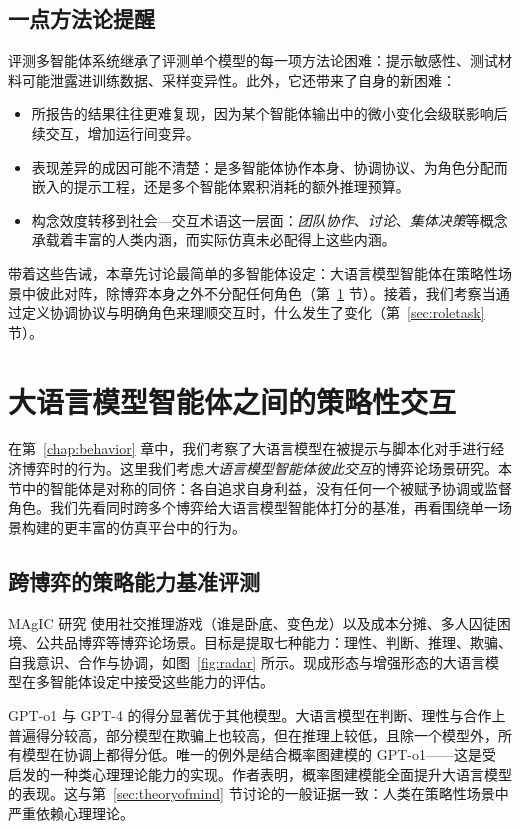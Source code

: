 \subsection{一点方法论提醒}
评测多智能体系统继承了评测单个模型的每一项方法论困难：提示敏感性、测试材料可能泄露进训练数据、采样变异性。此外，它还带来了自身的新困难：
\begin{itemize}
    \item 所报告的结果往往更难复现，因为某个智能体输出中的微小变化会级联影响后续交互，增加运行间变异。
    \item 表现差异的成因可能不清楚：是多智能体协作本身、协调协议、为角色分配而嵌入的提示工程，还是多个智能体累积消耗的额外推理预算。
    \item 构念效度转移到社会—交互术语这一层面：{\em 团队协作}、{\em 讨论}、{\em 集体决策}等概念承载着丰富的人类内涵，而实际仿真未必配得上这些内涵。
\end{itemize}
带着这些告诫，本章先讨论最简单的多智能体设定：大语言模型智能体在策略性场景中彼此对阵，除博弈本身之外不分配任何角色（第~\ref{sec:strat} 节）。接着，我们考察当通过定义协调协议与明确角色来理顺交互时，什么发生了变化（第~\ref{sec:roletask} 节）。


\section{大语言模型智能体之间的策略性交互} \label{sec:strat}
在第~\ref{chap:behavior} 章中，我们考察了大语言模型在被提示与脚本化对手进行经济博弈时的行为。这里我们考虑{\em 大语言模型智能体彼此交互}的博弈论场景研究。本节中的智能体是对称的同侪：各自追求自身利益，没有任何一个被赋予协调或监督角色。我们先看同时跨多个博弈给大语言模型智能体打分的基准，再看围绕单一场景构建的更丰富的仿真平台中的行为。

\subsection{跨博弈的策略能力基准评测}
MAgIC 研究 \citep{xu2024magic} 使用社交推理游戏（谁是卧底、变色龙）以及成本分摊、多人囚徒困境、公共品博弈等博弈论场景。目标是提取七种能力：理性、判断、推理、欺骗、自我意识、合作与协调，如图~\ref{fig:radar} 所示。现成形态与增强形态的大语言模型在多智能体设定中接受这些能力的评估。

GPT-o1 与 GPT-4 的得分显著优于其他模型。大语言模型在判断、理性与合作上普遍得分较高，部分模型在欺骗上也较高，但在推理上较低，且除一个模型外，所有模型在协调上都得分低。唯一的例外是结合概率图建模的 GPT-o1——这是受 \citet{kollerfriendman2009pgm} 启发的一种类心理理论能力的实现。作者表明，概率图建模能全面提升大语言模型的表现。这与第~\ref{sec:theoryofmind} 节讨论的一般证据一致：人类在策略性场景中严重依赖心理理论。

